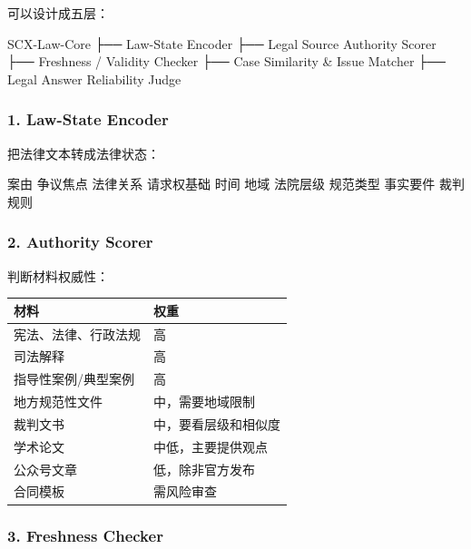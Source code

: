 \documentclass[
  12pt,
]{ctexart}
\newenvironment{Shaded}{}{}
\newcommand{\NormalTok}[1]{#1}
\begin{document}
可以设计成五层：

\begin{Shaded}
\begin{Highlighting}[]
\NormalTok{SCX{-}Law{-}Core}
\NormalTok{  ├── Law{-}State Encoder}
\NormalTok{  ├── Legal Source Authority Scorer}
\NormalTok{  ├── Freshness / Validity Checker}
\NormalTok{  ├── Case Similarity \& Issue Matcher}
\NormalTok{  ├── Legal Answer Reliability Judge}
\end{Highlighting}
\end{Shaded}

\subsubsection{1. Law-State Encoder}\label{law-state-encoder}

把法律文本转成法律状态：

\begin{Shaded}
\begin{Highlighting}[]
\NormalTok{案由}
\NormalTok{争议焦点}
\NormalTok{法律关系}
\NormalTok{请求权基础}
\NormalTok{时间}
\NormalTok{地域}
\NormalTok{法院层级}
\NormalTok{规范类型}
\NormalTok{事实要件}
\NormalTok{裁判规则}
\end{Highlighting}
\end{Shaded}

\subsubsection{2. Authority Scorer}\label{authority-scorer}

判断材料权威性：

\begin{longtable}[]{@{}ll@{}}
\toprule\noalign{}
材料 & 权重 \\
\midrule\noalign{}
\endhead
\bottomrule\noalign{}
\endlastfoot
宪法、法律、行政法规 & 高 \\
司法解释 & 高 \\
指导性案例/典型案例 & 高 \\
地方规范性文件 & 中，需要地域限制 \\
裁判文书 & 中，要看层级和相似度 \\
学术论文 & 中低，主要提供观点 \\
公众号文章 & 低，除非官方发布 \\
合同模板 & 需风险审查 \\
\end{longtable}

\subsubsection{3. Freshness Checker}\label{freshness-checker}
\end{document}

